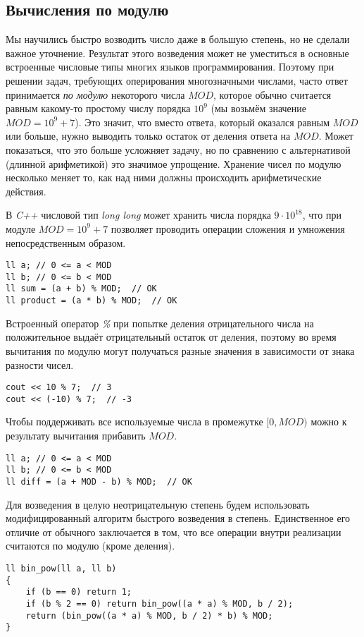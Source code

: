 \subsection{Вычисления по модулю}

    Мы научились быстро возводить число даже в большую степень, но не сделали важное уточнение. Результат этого возведения может не уместиться в основные встроенные числовые типы многих языков программирования. Поэтому при решении задач, требующих оперирования многозначными числами, часто ответ принимается \emph{по модулю} некоторого числа $MOD$, которое обычно считается равным какому-то простому числу порядка $10^9$ (мы возьмём значение $MOD=10^9+7$). Это значит, что вместо ответа, который оказался равным $MOD$ или больше, нужно выводить только остаток от деления ответа на $MOD$. Может показаться, что это больше усложняет задачу, но по сравнению с альтернативой (длинной арифметикой) это значимое упрощение. Хранение чисел по модулю несколько меняет то, как над ними должны происходить арифметические действия.

    В \textit{C++} числовой тип \textit{long long} может хранить числа порядка $9\cdot 10^{18}$, что при модуле $MOD=10^9+7$ позволяет проводить операции сложения и умножения непосредственным образом.
\begin{lstlisting}
ll a; // 0 <= a < MOD
ll b; // 0 <= b < MOD
ll sum = (a + b) % MOD;  // OK
ll product = (a * b) % MOD;  // OK
\end{lstlisting}

    Встроенный оператор \textit{\%} при попытке деления отрицательного числа на положительное выдаёт отрицательный остаток от деления, поэтому во время вычитания по модулю могут получаться разные значения в зависимости от знака разности чисел.
\begin{lstlisting}
cout << 10 % 7;  // 3
cout << (-10) % 7;  // -3
\end{lstlisting}
    Чтобы поддерживать все используемые числа в промежутке \([0, MOD)\) можно к результату вычитания прибавить $MOD$.
\begin{lstlisting}
ll a; // 0 <= a < MOD
ll b; // 0 <= b < MOD
ll diff = (a + MOD - b) % MOD;  // OK
\end{lstlisting}

    Для возведения в целую неотрицательную степень будем использовать модифицированный алгоритм быстрого возведения в степень. Единственное его отличие от обычного заключается в том, что все операции внутри реализации считаются по модулю (кроме деления).
\begin{lstlisting}
ll bin_pow(ll a, ll b)
{
    if (b == 0) return 1;
    if (b % 2 == 0) return bin_pow((a * a) % MOD, b / 2);
    return (bin_pow((a * a) % MOD, b / 2) * b) % MOD;
}
\end{lstlisting}

